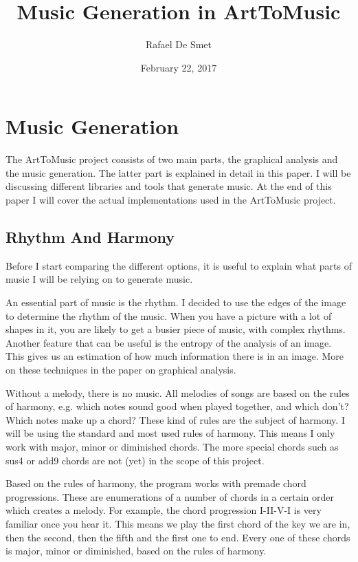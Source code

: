 \documentclass[12pt]{article}
\begin{document}
\title{Music Generation in ArtToMusic}
\date{February 22, 2017}
\author{Rafael De Smet}

\maketitle

\section{Music Generation}

The ArtToMusic project consists of two main parts, the graphical analysis and the music generation.
The latter part is explained in detail in this paper. I will be discussing different libraries and tools that generate music. At the end of this paper I will cover the actual implementations used in the ArtToMusic project.

\subsection{Rhythm And Harmony}

Before I start comparing the different options, it is useful to explain what parts of music I will be relying on to generate music.
\newline

An essential part of music is the rhythm. I decided to use the edges of the image to determine the rhythm of the music. When you have a picture with a lot of shapes in it, you are likely to get a busier piece of music, with complex rhythms. Another feature that can be useful is the entropy of the analysis of an image. This gives us an estimation of how much information there is in an image. More on these techniques in the paper on graphical analysis.
\newline

Without a melody, there is no music. All melodies of songs are based on the rules of harmony, e.g. which notes sound good when played together, and which don't? Which notes make up a chord? These kind of rules are the subject of harmony. I will be using the standard and most used rules of harmony. This means I only work with major, minor or diminished chords. The more special chords such as sus4 or add9 chords are not (yet) in the scope of this project.
\newline

Based on the rules of harmony, the program works with premade chord progressions. These are enumerations of a number of chords in a certain order which creates a melody. For example, the chord progression I-II-V-I is very familiar once you hear it. This means we play the first chord of the key we are in, then the second, then the fifth and the first one to end. Every one of these chords is major,  minor or diminished, based on the rules of harmony.
\newline
\end{document}
